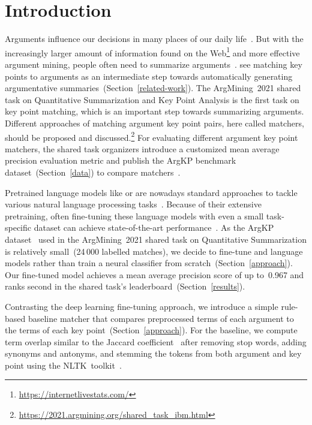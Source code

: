 \section{Introduction}\label{introduction}

Arguments influence our decisions in many places of our daily life~\cite{Bar-HaimEFKLS2020}.
But with the increasingly larger amount of information found on the Web\footnote{\url{https://internetlivestats.com/}} and more effective argument mining, people often need to summarize arguments~\cite{LawrenceR2019,Bar-HaimEFKLS2020}.
\citet{Bar-HaimEFKLS2020} see matching key points to arguments as an intermediate step towards automatically generating argumentative summaries~(Section~\ref{related-work}).
The ArgMining~2021 shared task on Quantitative Summarization and Key Point Analysis is the first task on key point matching, which is an important step towards summarizing arguments.
Different approaches of matching argument key point pairs, here called matchers, should be proposed and discussed.\footnote{\url{https://2021.argmining.org/shared_task_ibm.html}}
For evaluating different argument key point matchers, the shared task organizers introduce a customized mean average precision evaluation metric and publish the ArgKP benchmark dataset~(Section~\ref{data}) to compare matchers~\cite{Bar-HaimEFKLS2020}. %

Pretrained language models like \Bert or \Roberta are nowadays standard approaches to tackle various natural language processing tasks~\cite{DevlinCLT2019,LiuOGDJCLLZS2019}.
Because of their extensive pretraining, often fine-tuning these language models with even a small task-specific dataset can achieve state-of-the-art performance~\cite{DevlinCLT2019}.
As the ArgKP dataset~\cite{Bar-HaimEFKLS2020} used in the ArgMining~2021 shared task on Quantitative Summarization is relatively small~(24\,000 labelled matches), we decide to fine-tune \Bert and \Roberta language models rather than train a neural classifier from scratch~(Section~\ref{approach}).
Our fine-tuned \RobertaBase model achieves a mean average precision score of up to~0.967 and ranks second in the shared task's leaderboard~(Section~\ref{results}).

Contrasting the deep learning fine-tuning approach, we introduce a simple rule-based baseline matcher that compares preprocessed terms of each argument to the terms of each key point~(Section~\ref{approach}). For the baseline, we compute term overlap similar to the Jaccard coefficient~\cite{Jaccard1902} after removing stop words, adding synonyms and antonyms, and stemming the tokens from both argument and key point using the NLTK~toolkit~\cite{BirdL2004}.